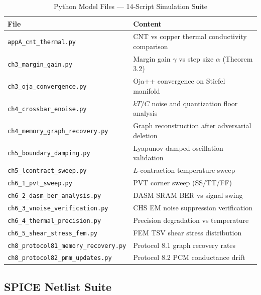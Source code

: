 \documentclass[12pt, a4paper]{article}
\begin{document}
\begin{table}[H]
  \centering
  \caption{Python Model Files — 14-Script Simulation Suite}
  \small
  \begin{tabularx}{\textwidth}{l X}
    \toprule
    \textbf{File} & \textbf{Content} \\
    \midrule
    \texttt{appA\_cnt\_thermal.py} & CNT vs copper thermal conductivity comparison \\
    \texttt{ch3\_margin\_gain.py} & Margin gain $\gamma$ vs step size $\alpha$ (Theorem 3.2) \\
    \texttt{ch3\_oja\_convergence.py} & Oja++ convergence on Stiefel manifold \\
    \texttt{ch4\_crossbar\_enoise.py} & $kT/C$ noise and quantization floor analysis \\
    \texttt{ch4\_memory\_graph\_recovery.py} & Graph reconstruction after adversarial deletion \\
    \texttt{ch5\_boundary\_damping.py} & Lyapunov damped oscillation validation \\
    \texttt{ch5\_lcontract\_sweep.py} & $L$-contraction temperature sweep \\
    \texttt{ch6\_1\_pvt\_sweep.py} & PVT corner sweep (SS/TT/FF) \\
    \texttt{ch6\_2\_dasm\_ber\_analysis.py} & DASM SRAM BER vs signal swing \\
    \texttt{ch6\_3\_vnoise\_verification.py} & CHS EM noise suppression verification \\
    \texttt{ch6\_4\_thermal\_precision.py} & Precision degradation vs temperature \\
    \texttt{ch6\_5\_shear\_stress\_fem.py} & FEM TSV shear stress distribution \\
    \texttt{ch8\_protocol81\_memory\_recovery.py} & Protocol 8.1 graph recovery rates \\
    \texttt{ch8\_protocol82\_pmm\_updates.py} & Protocol 8.2 PCM conductance drift \\
    \bottomrule
  \end{tabularx}
\end{table}

\subsection{SPICE Netlist Suite}
\end{document}
